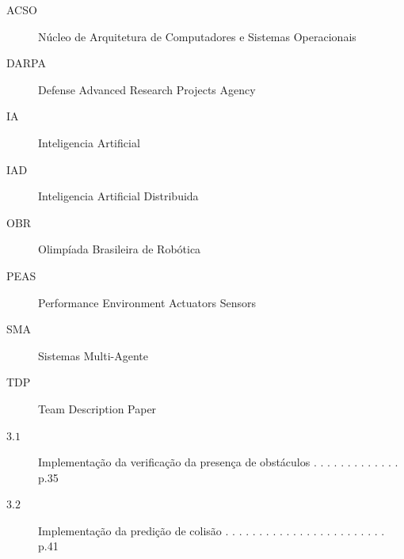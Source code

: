 \documentclass[font=plain]{abnt}
\begin{document}
    
    
    
    

    \listadefiguras %
    \listadetabelas %
    
    \begin{description}
      \item[ACSO]{Núcleo de Arquitetura de Computadores e Sistemas Operacionais}
      \item[DARPA]{Defense Advanced Research Projects Agency}
      \item[IA]{Inteligencia Artificial}
      \item[IAD]{Inteligencia Artificial Distribuida}
      \item[OBR]{Olimpíada Brasileira de Robótica}
      \item[PEAS]{Performance Environment Actuators Sensors}
      \item[SMA]{Sistemas Multi-Agente}
      \item[TDP]{Team Description Paper}
    \end{description}
    
    
    \begin{description}
      \item[$ 3.1 $] Implementação da verificação da presença de obstáculos . . . . . . . . . . . . .  p.35
      \item[$ 3.2 $] Implementação da predição de colisão . . . . . . . . . . . . . . . . . . . . . . . .  p.41
    \end{description}
    
    \sumario
    
    
    
    
    

 

    

    
\end{document}
